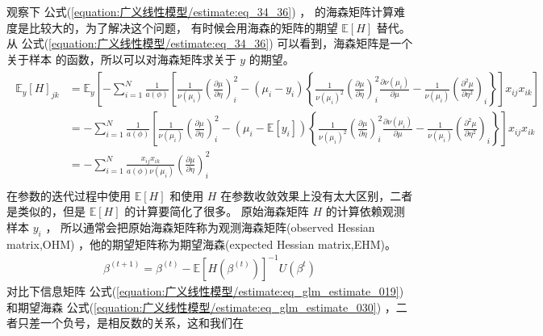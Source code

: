 \documentclass[letterpaper,10pt,english]{sphinxmanual}
\begin{document}
观察下 公式(\ref{equation:广义线性模型/estimate:eq_34_36}) ，
 的海森矩阵计算难度是比较大的，为了解决这个问题，
有时候会用海森的矩阵的期望 \(\mathbb{E}[H]\) 替代。
从 公式(\ref{equation:广义线性模型/estimate:eq_34_36}) 可以看到，海森矩阵是一个关于样本
的函数，所以可以对海森矩阵求关于 \(y\) 的期望。
\begin{align}\label{equation:广义线性模型/estimate:eq_glm_estimate_030}\!\begin{aligned}
\mathbb{E}_{y}[H]_{jk} &= \mathbb{E}_{y} \left [
-\sum_{i=1}^N \frac{1}{a(\phi)}
\left [
    \frac{1}{\nu(\mu_i)}  \left ( \frac{\partial \mu}{\partial \eta} \right )_i^2
    -(\mu_i-y_i)
        \left \{
            \frac{1}{\nu(\mu_i)^2}  \left ( \frac{\partial \mu }{\partial \eta} \right )_i^2 \frac{\partial \nu(\mu_i)}{\partial \mu}
            - \frac{1}{\nu(\mu_i)}  \left ( \frac{\partial^2 \mu}{\partial \eta^2} \right )_i
        \right \}
\right ] x_{ij}x_{ik}
\right ]\\
&=
-\sum_{i=1}^N \frac{1}{a(\phi)}
\left [
    \frac{1}{\nu(\mu_i)}  \left ( \frac{\partial \mu}{\partial \eta} \right )_i^2
    -(\mu_i- \mathbb{E} [y_i])
        \left \{
            \frac{1}{\nu(\mu_i)^2}  \left ( \frac{\partial \mu }{\partial \eta} \right )_i^2 \frac{\partial \nu(\mu_i)}{\partial \mu}
            - \frac{1}{\nu(\mu_i)}  \left ( \frac{\partial^2 \mu}{\partial \eta^2} \right )_i
        \right \}
\right ] x_{ij}x_{ik}\\
&= -\sum_{i=1}^N \frac{ x_{ij}x_{ik}}{a(\phi)\nu(\mu_i)}
    \left ( \frac{\partial \mu}{\partial \eta} \right )_i^2\\
\end{aligned}\end{align}
在参数的迭代过程中使用 \(\mathbb{E}[H]\) 和使用 \(H\)
在参数收敛效果上没有太大区别，二者是类似的，但是 \(\mathbb{E}[H]\) 的计算要简化了很多。
原始海森矩阵 \(H\) 的计算依赖观测样本 \(y_i\) ，
所以通常会把原始海森矩阵称为观测海森矩阵(observed Hessian matrix,OHM)
，他的期望矩阵称为期望海森(expected Hessian matrix,EHM)。
\begin{equation}\label{equation:广义线性模型/estimate:eq_glm_estimate_031}
\begin{split} \beta^{(t+1)} = \beta^{(t)} - \mathbb{E}[H(\beta^{(t)})]^{-1} U(\beta^t)\end{split}
\end{equation}
对比下信息矩阵 公式(\ref{equation:广义线性模型/estimate:eq_glm_estimate_019}) 和期望海森 公式(\ref{equation:广义线性模型/estimate:eq_glm_estimate_030})
，二者只差一个负号，是相反数的关系，这和我们在
\end{document}
